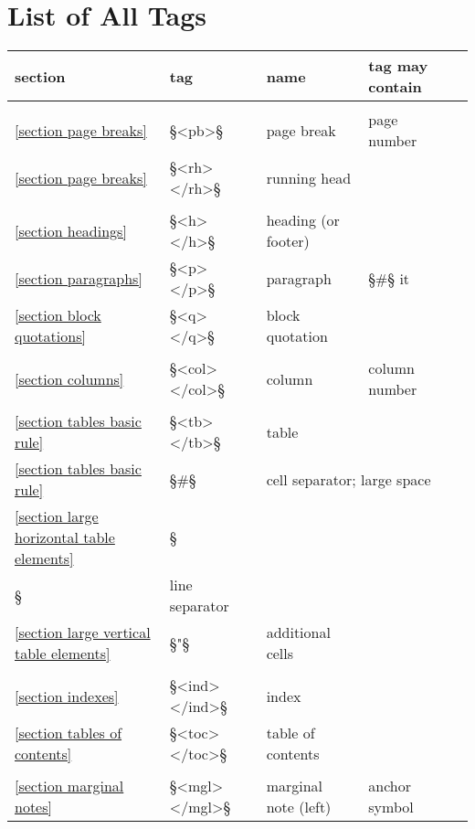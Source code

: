 

\newpage
\appendix


\section{List of All Tags}
\label{appendix list of all tags}

\newcommand{\eins}{{\fontspec{DejaVu Sans}{①}}}
\newcommand{\zwei}{{\fontspec{DejaVu Sans}{②}}}

\begin{longtable}[l]{@{}llll@{}l@{}}
section & tag & name & tag may contain \\[1mm]
\hline \\
\ref{section page breaks} & §<pb>§ & page break & page number & \eins \\
\ref{section page breaks} & §<rh> </rh>§ & running head && \eins \\
\\
\ref{section headings} & §<h> </h>§ & heading (or footer) && \eins \\
\ref{section paragraphs} & §<p> </p>§ & paragraph & §#§ it & \eins \\
\ref{section block quotations} & §<q> </q>§ & block quotation && \eins \\
\\
\ref{section columns} & §<col> </col>§ & column & column number & \eins \\
\\
\ref{section tables basic rule} & §<tb> </tb>§ & table && \eins \\
\ref{section tables basic rule} & §#§ & \multicolumn{2}{l}{cell separator; large space} \\
\ref{section large horizontal table elements} & §\\§ & line separator && \\
\ref{section large vertical table elements} & §"§ & additional cells && \\
\\
\ref{section indexes} & §<ind> </ind>§ & index && \eins \\
\ref{section tables of contents} & §<toc> </toc>§ & table of contents && \eins \\
\\
\ref{section marginal notes} & §<mgl> </mgl>§ & marginal note (left) & anchor symbol & \eins \\

\end{longtable}
